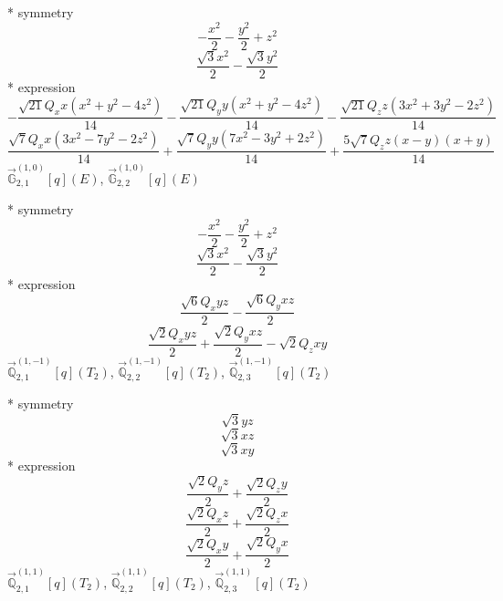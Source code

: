 \documentclass[fleqn,8pt]{jsarticle}
\begin{document}
\noindent\quad ** symmetry
\begin{dmath*}
- \frac{x^{2}}{2} - \frac{y^{2}}{2} + z^{2}
\end{dmath*}
\begin{dmath*}
\frac{\sqrt{3} x^{2}}{2} - \frac{\sqrt{3} y^{2}}{2}
\end{dmath*}
\noindent\quad ** expression
\begin{dmath*}
- \frac{\sqrt{21} Q_{x} x \left(x^{2} + y^{2} - 4 z^{2}\right)}{14} - \frac{\sqrt{21} Q_{y} y \left(x^{2} + y^{2} - 4 z^{2}\right)}{14} - \frac{\sqrt{21} Q_{z} z \left(3 x^{2} + 3 y^{2} - 2 z^{2}\right)}{14}
\end{dmath*}
\begin{dmath*}
\frac{\sqrt{7} Q_{x} x \left(3 x^{2} - 7 y^{2} - 2 z^{2}\right)}{14} + \frac{\sqrt{7} Q_{y} y \left(7 x^{2} - 3 y^{2} + 2 z^{2}\right)}{14} + \frac{5 \sqrt{7} Q_{z} z \left(x - y\right) \left(x + y\right)}{14}
\end{dmath*}
\noindent\quad $\vec{\mathbb{G}}_{2,1}^{(1,0)}[q](E)$, $\vec{\mathbb{G}}_{2,2}^{(1,0)}[q](E)$

\noindent\quad ** symmetry
\begin{dmath*}
- \frac{x^{2}}{2} - \frac{y^{2}}{2} + z^{2}
\end{dmath*}
\begin{dmath*}
\frac{\sqrt{3} x^{2}}{2} - \frac{\sqrt{3} y^{2}}{2}
\end{dmath*}
\noindent\quad ** expression
\begin{dmath*}
\frac{\sqrt{6} Q_{x} y z}{2} - \frac{\sqrt{6} Q_{y} x z}{2}
\end{dmath*}
\begin{dmath*}
\frac{\sqrt{2} Q_{x} y z}{2} + \frac{\sqrt{2} Q_{y} x z}{2} - \sqrt{2} Q_{z} x y
\end{dmath*}
\noindent\quad $\vec{\mathbb{Q}}_{2,1}^{(1,-1)}[q](T_{2})$, $\vec{\mathbb{Q}}_{2,2}^{(1,-1)}[q](T_{2})$, $\vec{\mathbb{Q}}_{2,3}^{(1,-1)}[q](T_{2})$

\noindent\quad ** symmetry
\begin{dmath*}
\sqrt{3} y z
\end{dmath*}
\begin{dmath*}
\sqrt{3} x z
\end{dmath*}
\begin{dmath*}
\sqrt{3} x y
\end{dmath*}
\noindent\quad ** expression
\begin{dmath*}
\frac{\sqrt{2} Q_{y} z}{2} + \frac{\sqrt{2} Q_{z} y}{2}
\end{dmath*}
\begin{dmath*}
\frac{\sqrt{2} Q_{x} z}{2} + \frac{\sqrt{2} Q_{z} x}{2}
\end{dmath*}
\begin{dmath*}
\frac{\sqrt{2} Q_{x} y}{2} + \frac{\sqrt{2} Q_{y} x}{2}
\end{dmath*}
\noindent\quad $\vec{\mathbb{Q}}_{2,1}^{(1,1)}[q](T_{2})$, $\vec{\mathbb{Q}}_{2,2}^{(1,1)}[q](T_{2})$, $\vec{\mathbb{Q}}_{2,3}^{(1,1)}[q](T_{2})$
\end{document}
